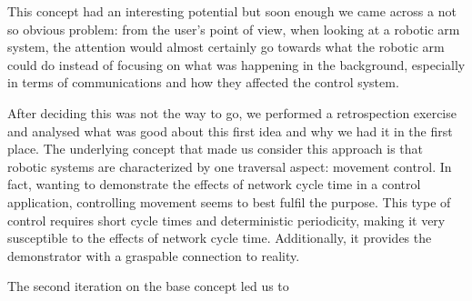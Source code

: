This concept had an interesting potential but soon enough we came across a not so obvious problem: from the user's point of view, when looking at a robotic arm system, the attention would almost certainly go towards what the robotic arm could do instead of focusing on what was happening in the background, especially in terms of communications and how they affected the control system.

After deciding this was not the way to go, we performed a retrospection exercise and analysed what was good about this first idea and why we had it in the first place.
The underlying concept that made us consider this approach is that robotic systems are characterized by one traversal aspect: movement control.
In fact, wanting to demonstrate the effects of network cycle time in a control application, controlling movement seems to best fulfil the purpose.
This type of control requires short cycle times and deterministic periodicity, making it very susceptible to the effects of network cycle time.
Additionally, it provides the demonstrator with a graspable connection to reality.

The second iteration on the base concept led us to
